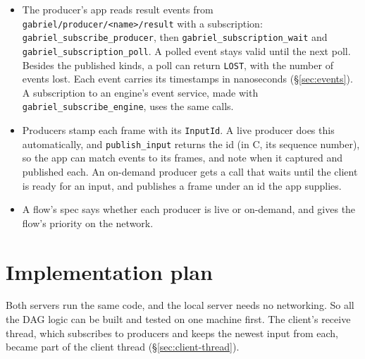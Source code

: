 \documentclass[11pt]{article}
\newcommand{\code}[1]{\texttt{#1}}
\begin{document}
\begin{itemize}[nosep]
        reached by name over iceoryx2. If it is given an address to bind, it
        can also be reached over QUIC; until QUIC exists, an address is
        rejected, and \code{bind\_addr} must be NULL.
  \item The producer's app reads result events from
        \nolinkurl{gabriel/producer/<name>/result} with a subscription:
        \code{gabriel\_subscribe\_producer}, then
        \code{gabriel\_subscription\_wait} and
        \code{gabriel\_subscription\_poll}. A polled event stays valid until
        the next poll. Besides the published kinds, a poll can return
        \code{LOST}, with the number of events lost. Each event carries its
        timestamps in nanoseconds (\S\ref{sec:events}). A subscription to an
        engine's event service, made with \code{gabriel\_subscribe\_engine},
        uses the same calls.
  \item Producers stamp each frame with its \code{InputId}. A live producer
        does this automatically, and \code{publish\_input} returns the id (in
        C, its sequence number), so the app can match events to its frames,
        and note when it captured and published each. An on-demand producer gets a
        call that waits until the client is ready for an input, and publishes
        a frame under an id the app supplies.
  \item A flow's spec says whether each producer is live or on-demand, and
        gives the flow's priority on the network.
\end{itemize}

\section{Implementation plan}

Both servers run the same code, and the local server needs no networking. So
all the DAG logic can be built and tested on one machine first. The client's
receive thread, which subscribes to producers and keeps the newest input from
each, became part of the client thread (\S\ref{sec:client-thread}).
\end{document}
